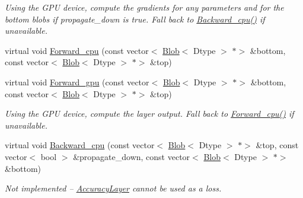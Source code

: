 \begin{DoxyCompactItemize}
\begin{DoxyCompactList}\small\item\em Using the G\+PU device, compute the gradients for any parameters and for the bottom blobs if propagate\+\_\+down is true. Fall back to \mbox{\hyperlink{classcaffe_1_1_accuracy_layer_a8084d42629a751f5b6322d9cb3f5986c}{Backward\+\_\+cpu()}} if unavailable. \end{DoxyCompactList}\item 
virtual void \mbox{\hyperlink{classcaffe_1_1_accuracy_layer_a61a6592772a54c1694da338b2d50b5f8}{Forward\+\_\+cpu}} (const vector$<$ \mbox{\hyperlink{classcaffe_1_1_blob}{Blob}}$<$ Dtype $>$ $\ast$$>$ \&bottom, const vector$<$ \mbox{\hyperlink{classcaffe_1_1_blob}{Blob}}$<$ Dtype $>$ $\ast$$>$ \&top)
\item 
\mbox{\label{classcaffe_1_1_accuracy_layer_a0c720e010f5ba0bd4ef3582d32ce37a9}} 
virtual void \mbox{\hyperlink{classcaffe_1_1_accuracy_layer_a0c720e010f5ba0bd4ef3582d32ce37a9}{Forward\+\_\+gpu}} (const vector$<$ \mbox{\hyperlink{classcaffe_1_1_blob}{Blob}}$<$ Dtype $>$ $\ast$$>$ \&bottom, const vector$<$ \mbox{\hyperlink{classcaffe_1_1_blob}{Blob}}$<$ Dtype $>$ $\ast$$>$ \&top)
\begin{DoxyCompactList}\small\item\em Using the G\+PU device, compute the layer output. Fall back to \mbox{\hyperlink{classcaffe_1_1_accuracy_layer_ad61bb4c6984d9df6a61562cd5c19ff6d}{Forward\+\_\+cpu()}} if unavailable. \end{DoxyCompactList}\item 
\mbox{\label{classcaffe_1_1_accuracy_layer_a8084d42629a751f5b6322d9cb3f5986c}} 
virtual void \mbox{\hyperlink{classcaffe_1_1_accuracy_layer_a8084d42629a751f5b6322d9cb3f5986c}{Backward\+\_\+cpu}} (const vector$<$ \mbox{\hyperlink{classcaffe_1_1_blob}{Blob}}$<$ Dtype $>$ $\ast$$>$ \&top, const vector$<$ bool $>$ \&propagate\+\_\+down, const vector$<$ \mbox{\hyperlink{classcaffe_1_1_blob}{Blob}}$<$ Dtype $>$ $\ast$$>$ \&bottom)
\begin{DoxyCompactList}\small\item\em Not implemented -- \mbox{\hyperlink{classcaffe_1_1_accuracy_layer}{Accuracy\+Layer}} cannot be used as a loss. \end{DoxyCompactList}\item 
\mbox{\label{classcaffe_1_1_accuracy_layer_a4cd3015639d107e63f90672733ac019a}} 

\end{DoxyCompactItemize}
